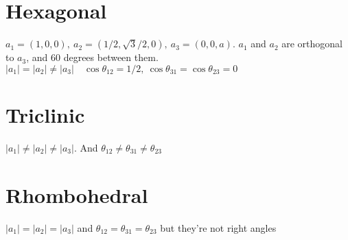 \documentclass[a4paper,10pt]{article} 	%
\numberwithin{equation}{section}
\begin{document}
	
	\section{Hexagonal}
	$ a_1 = (1,0,0),\ a_2 = (1/2,\sqrt{3}/2,0),\ a_3 = (0,0,a) $. $a_1$ and $a_2$ are orthogonal to $a_3$, and 60 degrees between them.
	$|a_1| = |a_2| \neq |a_3| \quad \cos \theta_{12} = 1/2, \ \cos \theta_{31} = \cos \theta_{23} = 0$
	
	\section{Triclinic}
	$|a_1| \neq |a_2| \neq |a_3|$. And $\theta_{12} \neq \theta_{31} \neq \theta_{23}$
	
	\section{Rhombohedral}
	$|a_1| = |a_2| = |a_3|$ and $\theta_{12} = \theta_{31} = \theta_{23}$ but they're not right angles
\end{document}
